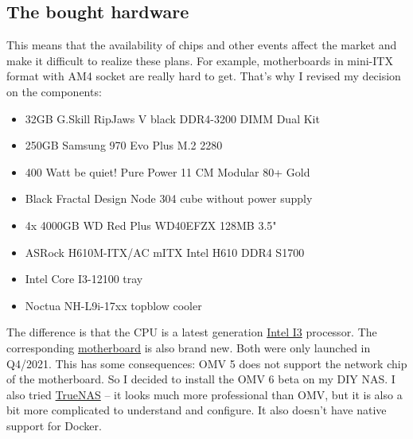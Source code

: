 \subsection{The bought hardware}

\begin{figure}[H]
    \centering
    \begin{Huge}
    \end{Huge}
\end{figure}

This means that the availability of chips and other events affect the market
and make it difficult to realize these plans. For example, motherboards in
mini-ITX format with AM4 socket are really hard to get. That's why I revised
my decision on the components:

\begin{itemize}
    \item 32GB G.Skill RipJaws V black DDR4-3200 DIMM Dual Kit
    \item 250GB Samsung 970 Evo Plus M.2 2280
    \item 400 Watt be quiet! Pure Power 11 CM Modular 80+ Gold
    \item Black Fractal Design Node 304 cube without power supply
    \item 4x 4000GB WD Red Plus WD40EFZX 128MB 3.5"
    \item ASRock H610M-ITX/AC mITX Intel H610 DDR4 S1700
    \item Intel Core I3-12100 tray
    \item Noctua NH-L9i-17xx topblow cooler
\end{itemize}

The difference is that the CPU is a latest generation
\href{https://www.intel.com/content/www/us/en/products/sku/134584/intel-core-i312100-processor-12m-cache-up-to-4-30-ghz/specifications.html?wapkw=12100}{Intel I3}
processor. The corresponding
\href{https://www.asrock.com/MB/Intel/H610M-ITXac/index.de.asp}{motherboard}
is also brand new. Both were only launched in Q4/2021. This has some
consequences: \gls{OMV} 5 does not support the network chip of the motherboard.
So I decided to install the \gls{OMV} 6 beta on my DIY \gls{NAS}. I also tried
\href{https://www.truenas.com/}{TrueNAS} -- it looks much more professional
than \gls{OMV}, but it is also a bit more complicated to understand and
configure. It also doesn't have native support for \gls{Docker}.

